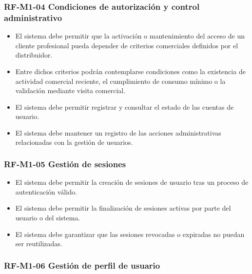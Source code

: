 \vspace{-0.75em}
\subsubsection{RF-M1-04 Condiciones de autorización y control administrativo}
\vspace{-1em}

\begin{itemize}
    \item El sistema debe permitir que la activación o mantenimiento del acceso de un cliente profesional pueda depender de criterios comerciales definidos por el distribuidor.
    \item Entre dichos criterios podrán contemplarse condiciones como la existencia de actividad comercial reciente, el cumplimiento de consumo mínimo o la validación mediante visita comercial.
    \item El sistema debe permitir registrar y consultar el estado de las cuentas de usuario.
    \item El sistema debe mantener un registro de las acciones administrativas relacionadas con la gestión de usuarios.
\end{itemize}

\vspace{-0.75em}
\subsubsection{RF-M1-05 Gestión de sesiones}
\vspace{-1em}

\begin{itemize}
    \item El sistema debe permitir la creación de sesiones de usuario tras un proceso de autenticación válido.
    \item El sistema debe permitir la finalización de sesiones activas por parte del usuario o del sistema.
    \item El sistema debe garantizar que las sesiones revocadas o expiradas no puedan ser reutilizadas.
\end{itemize}

\vspace{-0.75em}
\subsubsection{RF-M1-06 Gestión de perfil de usuario}
\vspace{-1em}

